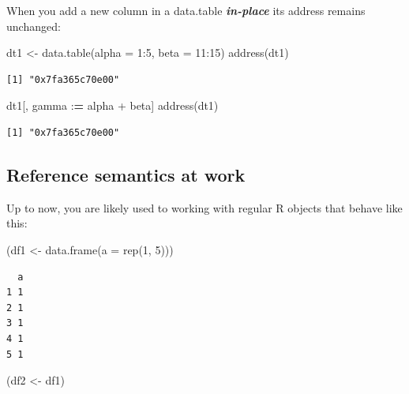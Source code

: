 \documentclass[
]{book}
\newenvironment{Shaded}{\begin{snugshade}}{\end{snugshade}}
\newcommand{\AttributeTok}[1]{\textcolor[rgb]{0.77,0.63,0.00}{#1}}
\newcommand{\DecValTok}[1]{\textcolor[rgb]{0.00,0.00,0.81}{#1}}
\newcommand{\ErrorTok}[1]{\textcolor[rgb]{0.64,0.00,0.00}{\textbf{#1}}}
\newcommand{\FunctionTok}[1]{\textcolor[rgb]{0.00,0.00,0.00}{#1}}
\newcommand{\NormalTok}[1]{#1}
\newcommand{\OtherTok}[1]{\textcolor[rgb]{0.56,0.35,0.01}{#1}}
\newcommand{\SpecialCharTok}[1]{\textcolor[rgb]{0.00,0.00,0.00}{#1}}
\begin{document}
When you add a new column in a data.table \textbf{\emph{in-place}} its address remains unchanged:

\begin{Shaded}
\begin{Highlighting}[]
\NormalTok{dt1 }\OtherTok{\textless{}{-}} \FunctionTok{data.table}\NormalTok{(}\AttributeTok{alpha =} \DecValTok{1}\SpecialCharTok{:}\DecValTok{5}\NormalTok{, }\AttributeTok{beta =} \DecValTok{11}\SpecialCharTok{:}\DecValTok{15}\NormalTok{)}
\FunctionTok{address}\NormalTok{(dt1)}
\end{Highlighting}
\end{Shaded}

\begin{verbatim}
[1] "0x7fa365c70e00"
\end{verbatim}

\begin{Shaded}
\begin{Highlighting}[]
\NormalTok{dt1[, gamma }\SpecialCharTok{:}\ErrorTok{=}\NormalTok{ alpha }\SpecialCharTok{+}\NormalTok{ beta]}
\FunctionTok{address}\NormalTok{(dt1)}
\end{Highlighting}
\end{Shaded}

\begin{verbatim}
[1] "0x7fa365c70e00"
\end{verbatim}

\hypertarget{reference-semantics-at-work}{%
\subsection{Reference semantics at work}\label{reference-semantics-at-work}}

Up to now, you are likely used to working with regular R objects that behave like this:

\begin{Shaded}
\begin{Highlighting}[]
\NormalTok{(df1 }\OtherTok{\textless{}{-}} \FunctionTok{data.frame}\NormalTok{(}\AttributeTok{a =} \FunctionTok{rep}\NormalTok{(}\DecValTok{1}\NormalTok{, }\DecValTok{5}\NormalTok{)))}
\end{Highlighting}
\end{Shaded}

\begin{verbatim}
  a
1 1
2 1
3 1
4 1
5 1
\end{verbatim}

\begin{Shaded}
\begin{Highlighting}[]
\NormalTok{(df2 }\OtherTok{\textless{}{-}}\NormalTok{ df1)}
\end{Highlighting}
\end{Shaded}
\end{document}
